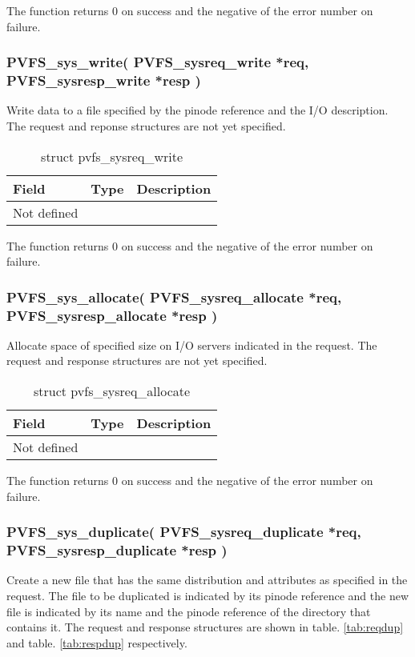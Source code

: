 \documentclass[11pt, letterpaper]{article}
\begin{document}
The function returns 0 on success and the negative of the error
number on failure.

\subsubsection{PVFS\_sys\_write(
PVFS\_sysreq\_write *req,
PVFS\_sysresp\_write *resp
)}

Write data to a file specified by the pinode reference and the
I/O description. The request and reponse structures are not yet 
specified.

\begin{table}[H]
\begin{tabular}{|l|l|l|}
\hline
Field & Type & Description \\
\hline
\hline
Not defined & & \\
\hline
\end{tabular}
\caption{struct pvfs\_sysreq\_write}\label{tab:reqwrite}
\end{table}

The function returns 0 on success and the negative of the error
number on failure.

\subsubsection{PVFS\_sys\_allocate(
PVFS\_sysreq\_allocate *req,
PVFS\_sysresp\_allocate *resp
)}

Allocate space of specified size on I/O servers indicated in the
request. The request and response structures are not yet specified.

\begin{table}[H]
\begin{tabular}{|l|l|l|}
\hline
Field & Type & Description \\
\hline
\hline
Not defined & & \\
\hline
\end{tabular}
\caption{struct pvfs\_sysreq\_allocate}\label{tab:reqalloc}
\end{table}

The function returns 0 on success and the negative of the error
number on failure.

\subsubsection{PVFS\_sys\_duplicate(
PVFS\_sysreq\_duplicate *req,
PVFS\_sysresp\_duplicate *resp
)}

Create a new file that has the same distribution and attributes as
specified in the request. The file to be duplicated is indicated by its
pinode reference and the new file is indicated by its name and the
pinode reference of the directory that contains it. The request and
response structures are shown in table. \ref{tab:reqdup} and table.
\ref{tab:respdup} respectively.
\end{document}
